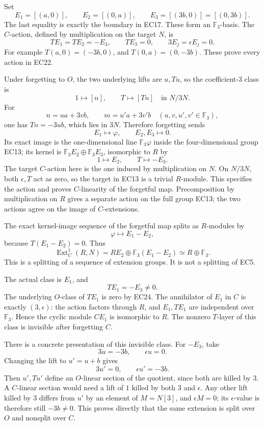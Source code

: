 \documentclass[
  10pt,
]{article}
\begin{document}
Set \[
E_1=[(a,0)],\qquad E_2=[(0,a)],\qquad
E_3=[(3b,0)]=[(0,3b)].
\tag{EC21}
\] The last equality is exactly the boundary in EC17. These form an
\(\mathbb F_3\)-basis. The \(C\)-action, defined by multiplication on
the target \(N\), is \[
TE_1=TE_2=-E_3,\qquad TE_3=0,\qquad
3E_j=\epsilon E_j=0.
\tag{EC22}
\] For example \(T(a,0)=(-3b,0)\), and \(T(0,a)=(0,-3b)\). These prove
every action in EC22.

Under forgetting to \(O\), the two underlying lifts are \(u,Tu\), so the
coefficient-3 class is \[
1\longmapsto[n],\qquad T\longmapsto[Tn]
\quad\text{in }N/3N.
\tag{EC23}
\] For \[
n=u a+3v b,\qquad m=u'a+3v'b
\quad(u,v,u',v'\in\mathbb F_3),
\] one has \(Tn=-3u b\), which lies in \(3N\). Therefore forgetting
sends \[
E_1\mapsto\varphi,\qquad E_2,E_3\mapsto0.
\tag{EC24}
\] Its exact image is the one-dimensional line \(\mathbb F_3\varphi\)
inside the four-dimensional group EC13; its kernel is
\(\mathbb F_3E_2\oplus\mathbb F_3E_3\), isomorphic to \(R\) by \[
1\mapsto E_2,\qquad T\mapsto-E_3.
\] The target \(C\)-action here is the one induced by multiplication on
\(N\). On \(N/3N\), both \(\epsilon,T\) act as zero, so the target in
EC13 is a trivial \(R\)-module. This specifies the action and proves
\(C\)-linearity of the forgetful map. Precomposition by multiplication
on \(R\) gives a separate action on the full group EC13; the two actions
agree on the image of \(C\)-extensions.

The exact kernel-image sequence of the forgetful map splits as
\(R\)-modules by \[
\varphi\longmapsto E_1-E_2,
\] because \(T(E_1-E_2)=0\). Thus \[
\operatorname{Ext}^1_C(R,N)
=R E_2\oplus\mathbb F_3(E_1-E_2)
\simeq R\oplus\mathbb F_3.
\tag{EC25}
\] This is a splitting of a sequence of extension groups. It is not a
splitting of EC5.

The actual class is \(E_1\), and \[
TE_1=-E_3\ne0.
\tag{EC26}
\] The underlying \(O\)-class of \(TE_1\) is zero by EC24. The
annihilator of \(E_1\) in \(C\) is exactly \((3,\epsilon)\): the action
factors through \(R\), and \(E_1,TE_1\) are independent over
\(\mathbb F_3\). Hence the cyclic module \(CE_1\) is isomorphic to
\(R\). The nonzero \(T\)-layer of this class is invisible after
forgetting \(C\).

There is a concrete presentation of this invisible class. For \(-E_3\),
take \[
3u=-3b,\qquad\epsilon u=0.
\] Changing the lift to \(u'=u+b\) gives \[
3u'=0,\qquad \epsilon u'=-3b.
\tag{EC27}
\] Then \(u',Tu'\) define an \(O\)-linear section of the quotient, since
both are killed by 3. A \(C\)-linear section would need a lift of \(1\)
killed by both 3 and \(\epsilon\). Any other lift killed by 3 differs
from \(u'\) by an element of \(M=N[3]\), and \(\epsilon M=0\); its
\(\epsilon\)-value is therefore still \(-3b\ne0\). This proves directly
that the same extension is split over \(O\) and nonsplit over \(C\).
\end{document}
